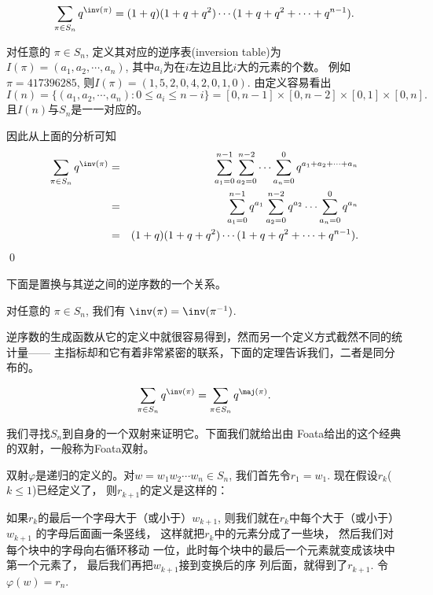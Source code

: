\begin{thm}
\begin{equation}
\sum_{\pi\in
S_n}q^{\inv(\pi)}=(1+q)(1+q+q^2)\cdots(1+q+q^2+\cdots+q^{n-1}).
\end{equation}
\end{thm}

\pf 对任意的 $\pi \in S_n$, 定义其对应的逆序表(inversion table)为
$I(\pi)=(a_1,a_2,\cdots,a_n)$,
其中$a_i$为在$i$左边且比$i$大的元素的个数。
例如 $\pi=417396285$, 则$I(\pi)=(1,5,2,0,4,2,0,1,0)$.
由定义容易看出
\[I(n)=\{(a_1,a_2,\cdots,a_n): 0\leq a_i \leq n-i\}=
[0,n-1]\times [0,n-2] \times [0,1]\times [0,n].\]
且$I(n)$与$S_n$是一一对应的。

因此从上面的分析可知
\begin{eqnarray*}
\sum_{\pi\in S_n}q^{\inv(\pi)}
&=&\sum_{a_1=0}^{n-1}\sum_{a_2=0}^{n-2}\cdots
\sum_{a_n=0}^{0}q^{a_1+a_2+\cdots+a_n}\\
&=& \sum_{a_1=0}^{n-1}q^{a_1}\sum_{a_2=0}^{n-2}q^{a_2} \cdots
\sum_{a_n=0}^{0}q^{a_n}\\
&=&(1+q)(1+q+q^2)\cdots(1+q+q^2+\cdots+q^{n-1}).
\end{eqnarray*}
\qed

下面是置换与其逆之间的逆序数的一个关系。
\begin{prop}
对任意的 $\pi \in S_n$, 我们有 $\inv(\pi)=\inv(\pi^{-1})$.
\end{prop}

逆序数的生成函数从它的定义中就很容易得到，然而另一个定义方式截然不同的统计量——
主指标却和它有着非常紧密的联系，下面的定理告诉我们，二者是同分布的。

\begin{thm}
\begin{equation}
\sum_{\pi\in S_n}q^{\inv(\pi)}=\sum_{\pi\in S_n}q^{\maj(\pi)}.
\end{equation}
\end{thm}

\pf
我们寻找$S_n$到自身的一个双射来证明它。下面我们就给出由
Foata给出的这个经典的双射，一般称为Foata双射。

双射$\varphi$是递归的定义的。对$w=w_1w_2\cdots w_n \in S_n$,
我们首先令$r_1=w_1$. 现在假设$r_k$($k\leq 1$)已经定义了，
则$r_{k+1}$的定义是这样的：

如果$r_k$的最后一个字母大于（或小于）$w_{k+1}$,
则我们就在$r_k$中每个大于（或小于）$w_{k+1}$ 的字母后面画一条竖线，
这样就把$r_k$中的元素分成了一些块，
然后我们对每个块中的字母向右循环移动
一位，此时每个块中的最后一个元素就变成该块中第一个元素了，
最后我们再把$w_{k+1}$接到变换后的序
列后面，就得到了$r_{k+1}$. 令$\varphi(w)=r_n$.

